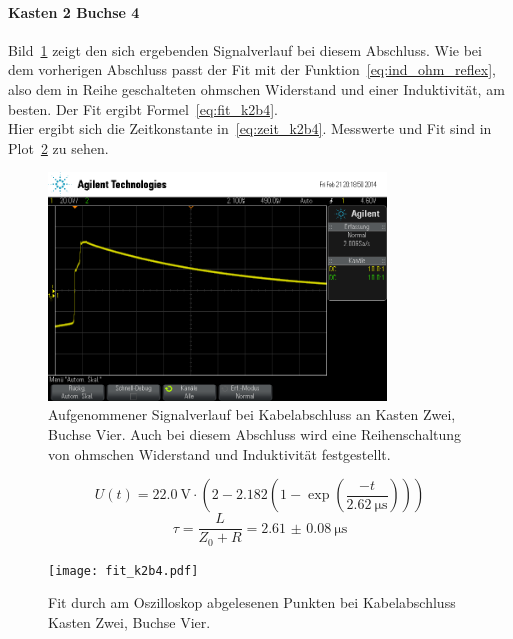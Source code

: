\paragraph{Kasten 2 Buchse 4}
Bild~\ref{fig:k2b4} zeigt den sich ergebenden Signalverlauf 
bei diesem Abschluss. 
Wie bei dem vorherigen Abschluss passt der Fit mit der 
Funktion~\eqref{eq:ind_ohm_reflex}, also dem in Reihe geschalteten 
ohmschen Widerstand und einer Induktivität, am besten. 
Der Fit ergibt Formel~\eqref{eq:fit_k2b4}.\\
Hier ergibt sich die Zeitkonstante in~\eqref{eq:zeit_k2b4}. 
Messwerte und Fit sind in Plot~\ref{fig:fit_k2b4} zu sehen.\\
%
\begin{figure}[]
\centering
\includegraphics[width=0.8\textwidth]{k2b4.png}
\caption{Aufgenommener Signalverlauf bei Kabelabschluss an 
Kasten Zwei, Buchse Vier. Auch bei diesem Abschluss wird eine 
Reihenschaltung von ohmschen Widerstand und Induktivität festgestellt.}
\label{fig:k2b4}
\end{figure}
%
\begin{equation}
U(t) = \SI{22.0}{\volt}\cdot\left(2 - 
2.182\left(1-\exp{\left(\frac{-t}{\SI{2.62}{\micro\second}}\right)}
\right)\right)
\label{eq:fit_k2b4}
\end{equation}
%
\begin{equation}
\tau = \frac{L}{Z_0 + R} = \SI{2.61(8)}{\micro\second}
\label{eq:zeit_k2b4}
\end{equation}
%
\begin{figure}[]
\centering
\texttt{[image: fit\_k2b4.pdf]}
\caption{Fit durch am Oszilloskop abgelesenen Punkten bei 
Kabelabschluss Kasten Zwei, Buchse Vier.}
\label{fig:fit_k2b4}
\end{figure}
%
\FloatBarrier
%
